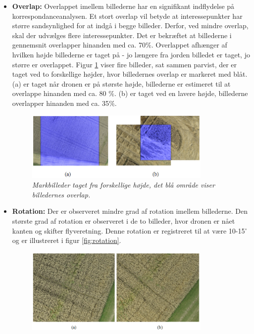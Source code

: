 \begin{itemize}
\item{\textbf{Overlap:} Overlappet imellem billederne har en signifikant indflydelse på korrespondanceanalysen. Et stort overlap vil betyde at interessepunkter har større sandsynlighed for at indgå i begge billeder. Derfor, ved mindre overlap, skal der udvælges flere interessepunkter. Det er bekræftet at billederne i gennemsnit overlapper hinanden med ca. 70\%. Overlappet afhænger af hvilken højde billederne er taget på - jo længere fra jorden billedet er taget, jo større er overlappet. Figur \ref{fig:overlap} viser fire billeder, sat sammen parvist, der er taget ved to forskellige højder, hvor billedernes overlap er markeret med blåt. (a) er taget når dronen er på største højde, billederne er estimeret til at overlappe hinanden med ca. 80 $\%$. (b) er taget ved en lavere højde, billederne overlapper hinanden med ca. 35$\%$.
\begin{figure}[H]
    \centering
    \includegraphics[width=0.85\textwidth]{fig/17.png}
     \vspace{-1em}
    \begin{center}    
       \caption{{\footnotesize \textit{Markbilleder taget fra forskellige højde, det blå område viser billedernes overlap.}}}
    \label{fig:overlap}
     \end{center}
     \vspace{-2.5em}
  \end{figure} \noindent }
\item{\textbf{Rotation:} Der er observeret mindre grad af rotation imellem billederne.
Den største grad af rotation er observeret i de to billeder, hvor dronen er nået kanten og skifter flyveretning. Denne rotation er registreret til at være 10-15$^{\circ}$ og er illustreret i figur \ref{fig:rotation}.
\begin{figure}[H]
    \centering
    \includegraphics[width=0.85\textwidth]{fig/19.png}

\end{figure}}
\end{itemize}
